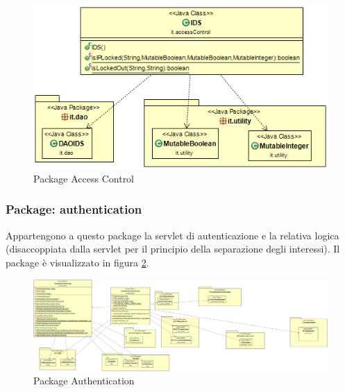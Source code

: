 \begin{figure}[!htbp]
	\centering
	\includegraphics[scale = .6]{img/dependencies_accesscontrol.png}
	\caption{Package Access Control}
	\label{gfx:accesscontrol}
\end{figure}


\subsubsection{Package: \textbf{authentication}}

Appartengono a questo package la servlet di autenticazione e la relativa logica (disaccoppiata dalla servlet per il principio della separazione degli interessi). Il package è visualizzato in figura \ref{gfx:dependencies_authentication}.

\tiny 
\begin{landscape}
\begin{center}
\vspace*{\fill}
\begin{figure}[!htbp]
	\centering
	\includegraphics[scale = .3]{img/dependencies_authentication}
	\caption{Package Authentication}
	\label{gfx:dependencies_authentication}
\end{figure}
\vspace*{\fill}

\end{center}	

\end{landscape}%
\normalsize


